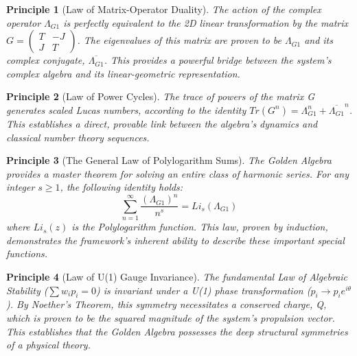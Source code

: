 \documentclass{article}
\theoremstyle{plain}
\newtheorem{principle}{Principle}[section] %
\theoremstyle{definition}
\theoremstyle{remark}
\begin{document}
\begin{principle}[Law of Matrix-Operator Duality]
The action of the complex operator $\Lambda_{G1}$ is perfectly equivalent to the 2D linear transformation by the matrix $G = \begin{pmatrix} T & -J \\ J & T \end{pmatrix}$. The eigenvalues of this matrix are proven to be $\Lambda_{G1}$ and its complex conjugate, $\overline{\Lambda_{G1}}$. This provides a powerful bridge between the system's complex algebra and its linear-geometric representation.
\end{principle}

\begin{principle}[Law of Power Cycles]
The trace of powers of the matrix G generates scaled Lucas numbers, according to the identity $Tr(G^n) = \Lambda_{G1}^n + \overline{\Lambda_{G1}}^n$. This establishes a direct, provable link between the algebra's dynamics and classical number theory sequences.
\end{principle}

\begin{principle}[The General Law of Polylogarithm Sums]
The Golden Algebra provides a master theorem for solving an entire class of harmonic series. For any integer $s \ge 1$, the following identity holds:
$$ \sum_{n=1}^{\infty} \frac{(\Lambda_{G1})^n}{n^s} = Li_s(\Lambda_{G1}) $$
where $Li_s(z)$ is the Polylogarithm function. This law, proven by induction, demonstrates the framework's inherent ability to describe these important special functions.
\end{principle}

\begin{principle}[Law of U(1) Gauge Invariance]
The fundamental Law of Algebraic Stability ($\sum w_i p_i = 0$) is invariant under a U(1) phase transformation ($p_i \rightarrow p_i e^{i\theta}$). By Noether's Theorem, this symmetry necessitates a conserved charge, Q, which is proven to be the squared magnitude of the system's propulsion vector. This establishes that the Golden Algebra possesses the deep structural symmetries of a physical theory.
\end{principle}
\end{document}
